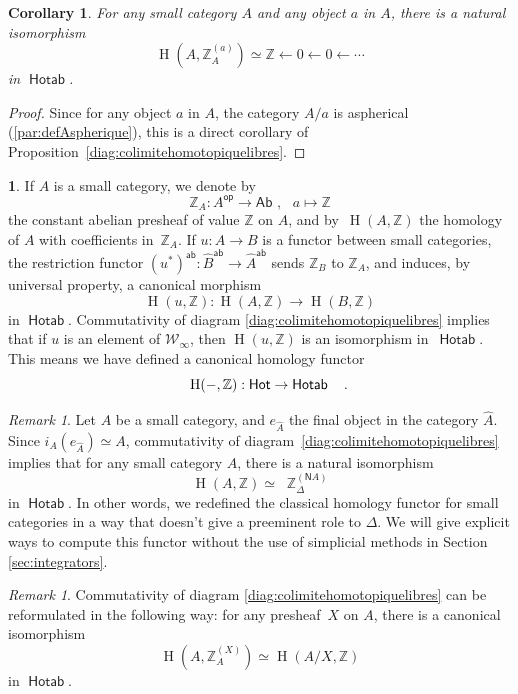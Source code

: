 \documentclass[10pt, english, a4paper, nothms]{amsart}
\theoremstyle{plain}
\newtheorem{coro}[theorem]{Corollary}
\theoremstyle{remark}
\newtheorem{remark}[theorem]{Remark}
\theoremstyle{definition}
\newtheorem{paragr}[theorem]{}
\numberwithin{equation}{theorem}
\newcommand\Z{\mathbb{Z}}
\DeclareMathOperator{\op}{\mathsf{op}}
\newcommand{\pref}[1]{{\widehat{ #1 }}}
\newcommand{\tranche}[2]{#1/{#2}}
\newcommand{\W}{\mathcal{W}}
\newcommand{\Hotab}{\operatorname{\mathsf{Hotab}}}
\newcommand{\Hot}{\operatorname{\mathsf{Hot}}}
\newcommand{\Ab}{{\mathsf{Ab}}}
\newcommand{\ab}{{\mathsf{ab}}}
\newcommand{\Wh}[2]{\Z_{#1}^{\left(#2\right)}}
\renewcommand{\H}[2]{\operatorname{{H}}(#1,#2)}
\newcommand{\prefab}[1]{\widehat{ #1 }^{\mathsf{ab}}}
\DeclareMathOperator{\dk}{\mathsf{C}_N}
\newcommand{\nerf}{\mathsf{N}}
\newcommand{\mdvirg}{\text{ ,}\hspace{10pt}}
\newcommand\zbox[1]{\makebox[0pt][l]{#1}}
\newcommand\pbox[1]{\zbox{\quad #1}} %
\begin{document}
\begin{coro}\label{coro:homologyCoefRep}
For any small category $A$ and any object $a$ in $A$, there is a
natural isomorphism 
\[
\H{A}{\Wh{A}{a}} \simeq \Z \leftarrow 0 \leftarrow 0 \leftarrow \cdots 
\]
in $\Hotab$. 
\end{coro}
\begin{proof}
Since for any object $a$ in $A$, the category $\tranche{A}{a}$ is aspherical
(\ref{par:defAspherique}), this is a direct corollary of
Proposition~\ref{diag:colimitehomotopiquelibres}.
\end{proof}

\begin{paragr}
If $A$ is a small category, we denote by
\[
  \Z_A: {A}^{\op} \to \Ab \mdvirg a \mapsto \Z
  \]
the constant abelian presheaf of value $\Z$ on $A$, and by~$\H{A}{\Z}$ the
homology of $A$ with coefficients in~$\Z_A$. If $u:A\to B$ is a functor between
small categories, the restriction functor $(u^*)^\ab: \prefab{B} \to
\prefab{A}$ sends $\Z_B$ to $\Z_A$, and induces, by universal property, a
canonical morphism 
\[
\H{u}{\Z}: \H{A}{\Z} \to \H{B}{\Z} 
\]
in $\Hotab$. Commutativity of diagram \ref{diag:colimitehomotopiquelibres}
implies that if $u$ is an element
of $\W_\infty$, then $\H{u}{\Z}$ is an isomorphism in~$\Hotab$. This
means we have defined a canonical homology functor 
\[
\H{-}{\Z}: \Hot \to \Hotab \pbox{.}
\]
\end{paragr}

\begin{remark}
Let $A$ be a small category, and $e_{\pref{A}}$ the final object in the
category $\pref{A}$. Since $i_A(e_{\pref{A}}) \simeq A$, commutativity of
diagram~\ref{diag:colimitehomotopiquelibres} implies that for any small
category $A$, there is a natural isomorphism 
\[
\H{A}{\Z} \simeq \dk\Wh{\Delta}{\nerf{A}}
\]
in $\Hotab$. In other words, we redefined the classical homology
functor for small categories in a way that doesn't give a preeminent
role to $\Delta$. We will give explicit ways to compute
this functor without the use of simplicial methods in Section
\ref{sec:integrators}.
\end{remark}

\begin{remark}\label{remark:homologieTrancheetLibres}
Commutativity of diagram \ref{diag:colimitehomotopiquelibres} can
be reformulated in the following way: for any presheaf~$X$ on $A$,
there is a canonical isomorphism 
\[
\H{A}{\Wh{A}{X}} \simeq \H{\tranche{A}{X}}{\Z} 
\]
in $\Hotab$.
\end{remark}
\end{document}

